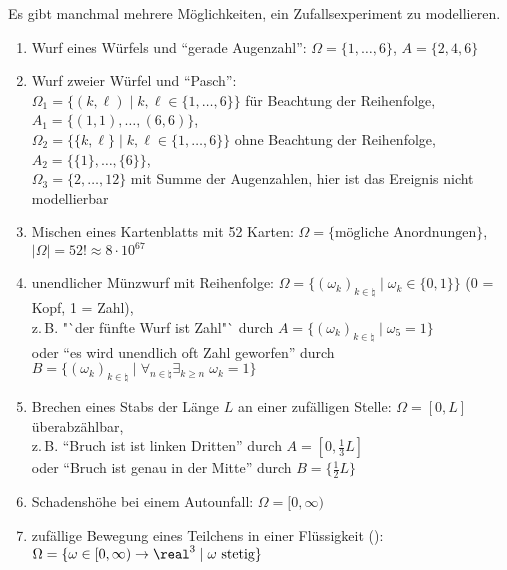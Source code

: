 \begin{Bsp}
    Es gibt manchmal mehrere Möglichkeiten, ein Zufallsexperiment zu modellieren.
    \begin{enumerate}
        \item
        Wurf eines Würfels und "`gerade Augenzahl"':
        $\Omega = \{1, \dotsc, 6\}$, $A = \{2, 4, 6\}$

        \item
        Wurf zweier Würfel und "`Pasch"':\\
        $\Omega_1 = \{(k, \ell) \;|\; k, \ell \in \{1, \dotsc, 6\}\}$
        für Beachtung der Reihenfolge, $A_1 = \{(1, 1), \dotsc, (6, 6)\}$,\\
        $\Omega_2 = \{\{k, \ell\} \;|\; k, \ell \in \{1, \dotsc, 6\}\}$
        ohne Beachtung der Reihenfolge, $A_2 = \{\{1\}, \dotsc, \{6\}\}$,\\
        $\Omega_3 = \{2, \dotsc, 12\}$ mit Summe der Augenzahlen,
        hier ist das Ereignis nicht modellierbar

        \item
        Mischen eines Kartenblatts mit 52 Karten:
        $\Omega = \{\text{mögliche Anordnungen}\}$,\\
        $|\Omega| = 52! \approx 8 \cdot 10^{67}$

        \item
        unendlicher Münzwurf mit Reihenfolge:
        $\Omega = \{(\omega_k)_{k \in \natural} \;|\; \omega_k \in \{0, 1\}\}$
        (0 = Kopf, 1 = Zahl),\\
        z.\,B. "`der fünfte Wurf ist Zahl"` durch
        $A = \{(\omega_k)_{k \in \natural} \;|\; \omega_5 = 1\}$\\
        oder "`es wird unendlich oft Zahl geworfen"' durch
        $B = \{(\omega_k)_{k \in \natural} \;|\;
        \forall_{n \in \natural} \exists_{k \ge n}\; \omega_k = 1\}$

        \item
        Brechen eines Stabs der Länge $L$ an einer zufälligen Stelle:
        $\Omega = [0, L]$ überabzählbar,\\
        z.\,B. "`Bruch ist ist linken Dritten"' durch $A = [0, \frac{1}{3} L]$\\
        oder "`Bruch ist genau in der Mitte"' durch $B = \{\frac{1}{2} L\}$

        \item
        Schadenshöhe bei einem Autounfall:
        $\Omega = [0, \infty)$

        \item
        zufällige Bewegung eines Teilchens in einer Flüssigkeit ():\\
        $\Omega = \{\omega \in [0, \infty) \rightarrow \real^3 \;|\; \omega \text{ stetig}\}$
    \end{enumerate}
\end{Bsp}

